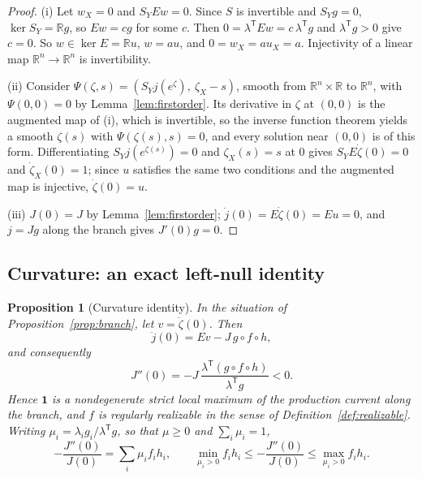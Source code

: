 \documentclass[11pt,reqno]{amsart}
\theoremstyle{plain}
\newtheorem{proposition}[theorem]{Proposition}
\theoremstyle{definition}
\theoremstyle{remark}
\numberwithin{equation}{section}
\newcommand{\R}{\mathbb{R}}
\newcommand{\one}{\mathbf{1}}
\newcommand{\Ker}{\operatorname{ker}}
\newcommand{\T}{\mathsf{T}}
\renewcommand{\odot}{\circ}
\begin{document}
\begin{proof}
(i) Let $w_X=0$ and $S_YEw=0$.  Since $S$ is invertible and $S_Yg=0$, $\Ker S_Y=\R g$, so $Ew=cg$ for some $c$.  Then $0=\lambda^{\T}Ew=c\,\lambda^{\T}g$ and $\lambda^{\T}g>0$ give $c=0$.  So $w\in\Ker E=\R u$, $w=au$, and $0=w_X=au_X=a$.  Injectivity of a linear map $\R^n\to\R^n$ is invertibility.

(ii) Consider $\Psi(\zeta,s)=(S_Yj(e^\zeta),\ \zeta_X-s)$, smooth from $\R^n\times\R$ to $\R^n$, with $\Psi(0,0)=0$ by Lemma~\ref{lem:firstorder}.  Its derivative in $\zeta$ at $(0,0)$ is the augmented map of (i), which is invertible, so the inverse function theorem yields a smooth $\zeta(s)$ with $\Psi(\zeta(s),s)=0$, and every solution near $(0,0)$ is of this form.  Differentiating $S_Yj(e^{\zeta(s)})=0$ and $\zeta_X(s)=s$ at $0$ gives $S_YE\dot\zeta(0)=0$ and $\dot\zeta_X(0)=1$; since $u$ satisfies the same two conditions and the augmented map is injective, $\dot\zeta(0)=u$.

(iii) $J(0)=J$ by Lemma~\ref{lem:firstorder}; $\dot j(0)=E\dot\zeta(0)=Eu=0$, and $j=Jg$ along the branch gives $J'(0)g=0$.
\end{proof}

\subsection{Curvature: an exact left-null identity}
\begin{proposition}[Curvature identity]\label{prop:curvature}
In the situation of Proposition~\ref{prop:branch}, let $v=\ddot\zeta(0)$.  Then
\begin{equation}\label{eq:secondjet}
\ddot j(0)=Ev-J\,g\odot f\odot h,
\end{equation}
and consequently
\begin{equation}\label{eq:curvature}
J''(0)=-J\,\frac{\lambda^{\T}(g\odot f\odot h)}{\lambda^{\T}g}<0 .
\end{equation}
Hence $\one$ is a nondegenerate strict local maximum of the production current along the branch, and $f$ is regularly realizable in the sense of Definition~\ref{def:realizable}.  Writing $\mu_i=\lambda_ig_i/\lambda^{\T}g$, so that $\mu\ge0$ and $\sum_i\mu_i=1$,
\begin{equation}\label{eq:average}
-\frac{J''(0)}{J(0)}=\sum_i\mu_if_ih_i,\qquad\min_{\mu_i>0}f_ih_i\le-\frac{J''(0)}{J(0)}\le\max_{\mu_i>0}f_ih_i .
\end{equation}
\end{proposition}
\end{document}

